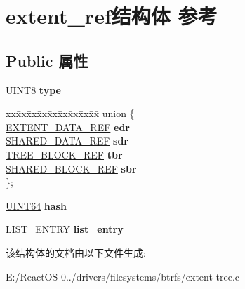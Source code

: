 \hypertarget{structextent__ref}{}\section{extent\+\_\+ref结构体 参考}
\label{structextent__ref}
\subsection*{Public 属性}
\begin{DoxyCompactItemize}
\item 
\mbox{\label{structextent__ref_a59a38367149dc1859102add663abbe3d}} 
\hyperlink{_processor_bind_8h_ab27e9918b538ce9d8ca692479b375b6a}{U\+I\+N\+T8} {\bfseries type}
\item 
\mbox{\label{structextent__ref_aa1cb4778f4194d7decde04a5824a0548}} 
\begin{tabbing}
xx\=xx\=xx\=xx\=xx\=xx\=xx\=xx\=xx\=\kill
union \{\\
\>\hyperlink{struct_e_x_t_e_n_t___d_a_t_a___r_e_f}{EXTENT\_DATA\_REF} {\bfseries edr}\\
\>\hyperlink{struct_s_h_a_r_e_d___d_a_t_a___r_e_f}{SHARED\_DATA\_REF} {\bfseries sdr}\\
\>\hyperlink{struct_t_r_e_e___b_l_o_c_k___r_e_f}{TREE\_BLOCK\_REF} {\bfseries tbr}\\
\>\hyperlink{struct_s_h_a_r_e_d___b_l_o_c_k___r_e_f}{SHARED\_BLOCK\_REF} {\bfseries sbr}\\
\}; \\

\end{tabbing}\item 
\mbox{\label{structextent__ref_aae4a504ffd27dfa9502a691cd84c8d9a}} 
\hyperlink{_processor_bind_8h_a57be03562867144161c1bfee95ca8f7c}{U\+I\+N\+T64} {\bfseries hash}
\item 
\mbox{\label{structextent__ref_a0ab587bfb66fcea27c6eb2c92929c5ac}} 
\hyperlink{struct___l_i_s_t___e_n_t_r_y}{L\+I\+S\+T\+\_\+\+E\+N\+T\+RY} {\bfseries list\+\_\+entry}
\end{DoxyCompactItemize}


该结构体的文档由以下文件生成\+:\begin{DoxyCompactItemize}
\item 
E\+:/\+React\+O\+S-\/0../drivers/filesystems/btrfs/extent-\/tree.\+c\end{DoxyCompactItemize}
